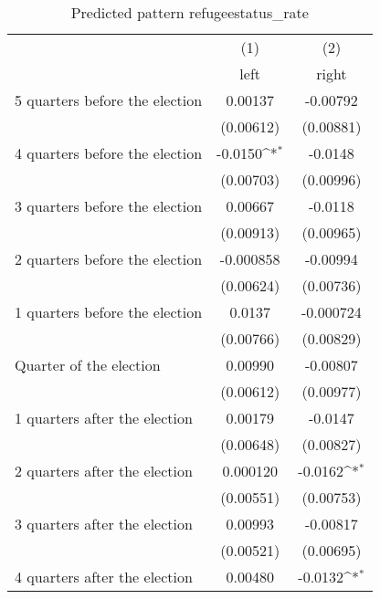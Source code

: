 \begin{table}[htbp]\centering
\def\sym#1{\ifmmode^{#1}\else\(^{#1}\)\fi}
\caption{Predicted pattern refugeestatus\_rate}
\begin{tabular}{l*{2}{c}}
\hline\hline
                    &\multicolumn{1}{c}{(1)}&\multicolumn{1}{c}{(2)}\\
                    &\multicolumn{1}{c}{left}&\multicolumn{1}{c}{right}\\
\hline
 5 quarters before the election&     0.00137         &    -0.00792         \\
                    &   (0.00612)         &   (0.00881)         \\
[1em]
 4 quarters before the election&     -0.0150\sym{*}  &     -0.0148         \\
                    &   (0.00703)         &   (0.00996)         \\
[1em]
 3 quarters before the election&     0.00667         &     -0.0118         \\
                    &   (0.00913)         &   (0.00965)         \\
[1em]
 2 quarters before the election&   -0.000858         &    -0.00994         \\
                    &   (0.00624)         &   (0.00736)         \\
[1em]
 1 quarters before the election&      0.0137         &   -0.000724         \\
                    &   (0.00766)         &   (0.00829)         \\
[1em]
Quarter of the election&     0.00990         &    -0.00807         \\
                    &   (0.00612)         &   (0.00977)         \\
[1em]
 1 quarters after the election&     0.00179         &     -0.0147         \\
                    &   (0.00648)         &   (0.00827)         \\
[1em]
 2 quarters after the election&    0.000120         &     -0.0162\sym{*}  \\
                    &   (0.00551)         &   (0.00753)         \\
[1em]
 3 quarters after the election&     0.00993         &    -0.00817         \\
                    &   (0.00521)         &   (0.00695)         \\
[1em]
 4 quarters after the election&     0.00480         &     -0.0132\sym{*}  \\

\end{tabular}
\end{table}
